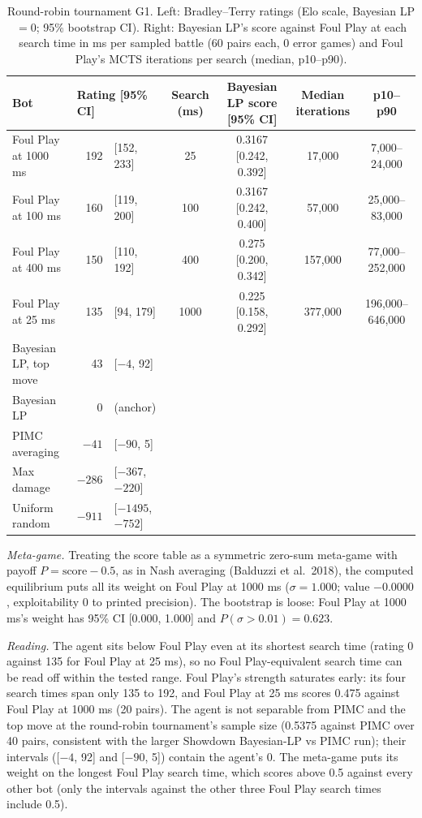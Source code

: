\documentclass[10pt]{article}
\theoremstyle{plain}
\theoremstyle{definition}
\theoremstyle{remark}
\begin{document}
\begin{table}[!htbp]\centering\small
\caption{Round-robin tournament G1. Left: Bradley--Terry ratings (Elo scale, Bayesian LP $=0$; 95\% bootstrap CI). Right: Bayesian LP's
score against Foul Play at each search time in ms per sampled battle (60 pairs each, 0 error games) and Foul Play's MCTS iterations per search
(median, p10--p90).}\label{tab:gauntlet}
\begin{tabular}{@{}lr@{\ }l@{\qquad}cccc@{}}\toprule
Bot & \multicolumn{2}{l}{Rating [95\% CI]} & Search (ms) & Bayesian LP score [95\% CI] & Median iterations & p10--p90 \\ \midrule
Foul Play at 1000 ms & 192 & [152, 233] & 25 & 0.3167 [0.242, 0.392] & 17,000 & 7,000--24,000 \\
Foul Play at 100 ms & 160 & [119, 200] & 100 & 0.3167 [0.242, 0.400] & 57,000 & 25,000--83,000 \\
Foul Play at 400 ms & 150 & [110, 192] & 400 & 0.275 [0.200, 0.342] & 157,000 & 77,000--252,000 \\
Foul Play at 25 ms & 135 & [94, 179] & 1000 & 0.225 [0.158, 0.292] & 377,000 & 196,000--646,000 \\
Bayesian LP, top move & 43 & [$-4$, 92] & & & & \\
Bayesian LP & 0 & (anchor) & & & & \\
PIMC averaging & $-41$ & [$-90$, 5] & & & & \\
Max damage & $-286$ & [$-367$, $-220$] & & & & \\
Uniform random & $-911$ & [$-1495$, $-752$] & & & & \\ \bottomrule
\end{tabular}\end{table}

\emph{Meta-game.} Treating the score table as a symmetric zero-sum meta-game with payoff $P=\text{score}-0.5$, as in
Nash averaging (Balduzzi et al.\ 2018), the computed equilibrium puts all its weight on Foul Play at 1000 ms ($\sigma=1.000$;
value $-0.0000$, exploitability 0 to printed precision). The bootstrap is loose: Foul Play at 1000 ms's weight has 95\% CI [0.000,
1.000] and $P(\sigma>0.01)=0.623$.

\emph{Reading.} The agent sits below Foul Play even at its shortest search time (rating 0 against 135 for Foul Play at 25 ms), so no
Foul Play-equivalent search time can be read off within the tested range. Foul Play's strength saturates early: its four
search times span only 135 to 192, and Foul Play at 25 ms scores 0.475 against Foul Play at 1000 ms (20 pairs). The agent is not separable from PIMC and the top move at the round-robin tournament's sample size (0.5375 against PIMC over 40 pairs, consistent with the larger Showdown Bayesian-LP vs PIMC run); their intervals ([$-4$, 92] and [$-90$, 5]) contain the agent's 0. The meta-game puts its weight on the longest
Foul Play search time, which scores above 0.5 against every other bot (only the intervals against the other three Foul Play search times include 0.5).
\end{document}
